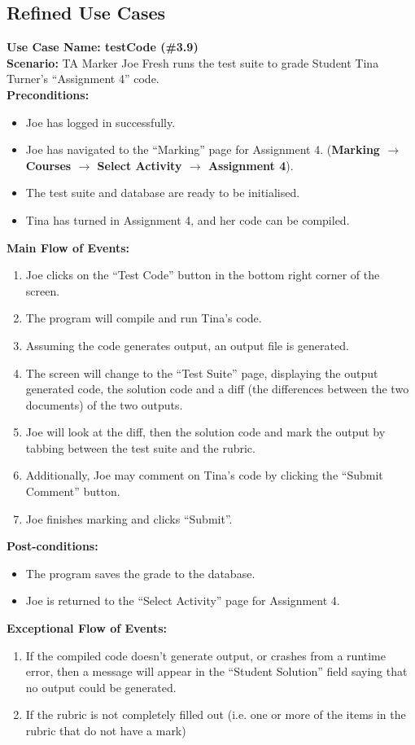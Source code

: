 \documentclass{article}
\begin{document}
\subsection{Refined Use Cases}
\textbf{Use Case Name: testCode (\#3.9)}\\
\textbf{Scenario:}
TA Marker Joe Fresh runs the test suite to grade Student Tina Turner’s “Assignment 4” 
code.\\
\textbf{Preconditions:}
\begin{itemize}
	\item Joe has logged in successfully.
	\item Joe has navigated to the “Marking” page for Assignment 4. (\textbf{Marking 
		$\rightarrow$ Courses $\rightarrow$ Select Activity $\rightarrow$ Assignment 4}).
	\item The test suite  and database are ready to be initialised.
	\item Tina has turned in Assignment 4, and her code can be compiled.
\end{itemize}
\textbf{Main Flow of Events:}
\begin{enumerate} 
	\item Joe clicks on the “Test Code” button in the bottom right corner of the screen.
	\item The program will compile and run Tina’s  code.
	\item Assuming the code generates output, an output file is generated.
	\item The screen will change to the “Test Suite” page, displaying the output 
		generated code, the solution code and a diff (the differences between the 
		two documents) of the two outputs.
	\item Joe will look at the diff, then the solution code and mark the output by
		tabbing between the test suite and the rubric.	
	\item Additionally, Joe may comment on Tina’s code by 	clicking the “Submit 
		Comment” button.
	\item Joe finishes marking and clicks “Submit”.
\end{enumerate}
\textbf{Post-conditions:}
\begin{itemize}
\item The program saves the grade to the database. 
\item Joe is returned to the “Select Activity” page for Assignment 4.
\end{itemize}
\textbf{Exceptional Flow of Events:}
\begin{enumerate}
 	\item If the compiled code doesn’t generate output, or crashes from a runtime 
 		error, then a message will appear in the “Student Solution” field saying that  
 		no output could be generated.
	\item If the rubric is not completely filled out (i.e. one or more of the items in the 
		rubric that do not have a mark)
\end{enumerate}
\end{document}
